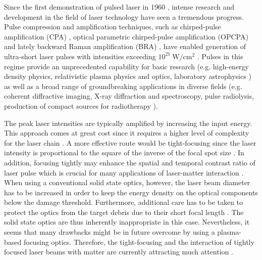 Since the first demonstration of pulsed laser in 1960 \cite{Maiman1960}, intense research and development in the field of laser technology have seen a tremendous progress. Pulse compression and amplification techniques, such as chirped-pulse amplification (CPA) \cite{StricklandMourou1985}, optical parametric chirped-pulse amplification (OPCPA) \cite{Dubietis1992} and lately backward Raman amplification (BRA) \cite{Malkin1999}, have enabled generation of ultra-short laser pulses with intensities exceeding $ 10^{21} \ \mathrm{W/cm^{2}} $ \cite{Danson2015}. Pulses in this regime provide an unprecedented capability for basic research (e.g. high-energy density physics, relativistic plasma physics and optics, laboratory astrophysics \cite{Council2003, Graziani2014, Lebedev2007, Bridgman1958, Krehl2008, Andreev2006, Weber2013, Bulanov2015, Zakharov2003}) as well as a broad range of groundbreaking applications in diverse fields (e.g. coherent diffractive imaging, X-ray diffraction and spectroscopy, pulse radiolysis, production of compact sources for radiotherapy \cite{Zewail2010, Bulanov2004, Malka2004}).

The peak laser intensities are typically amplified by increasing the input energy. This approach comes at great cost since it requires a higher level of complexity for the laser chain \cite{Fuchs2014}. A more effective route would be tight-focusing since the laser intensity is proportional to the square of the inverse of the focal spot size \cite{Kon2010}. In addition, focusing tightly may enhance the spatial and temporal contrast ratio of laser pulse which is crucial for many applications of laser-matter interaction \cite{Fuchs2014}. When using a conventional solid state optics, however, the laser beam diameter has to be increased in order to keep the energy density on the optical components below the damage threshold. Furthermore, additional care has to be taken to protect the optics from the target debris due to their short focal length \cite{Liu2011}. The solid state optics are thus inherently inappropriate in this case. Nevertheless, it seems that many drawbacks might be in future overcome by using a plasma-based focusing optics. Therefore, the tight-focusing and the interaction of tightly focused laser beams with matter are currently attracting much attention \cite{Popov2008, Popov2009, Lifschitz2016, Yan2005}. 

